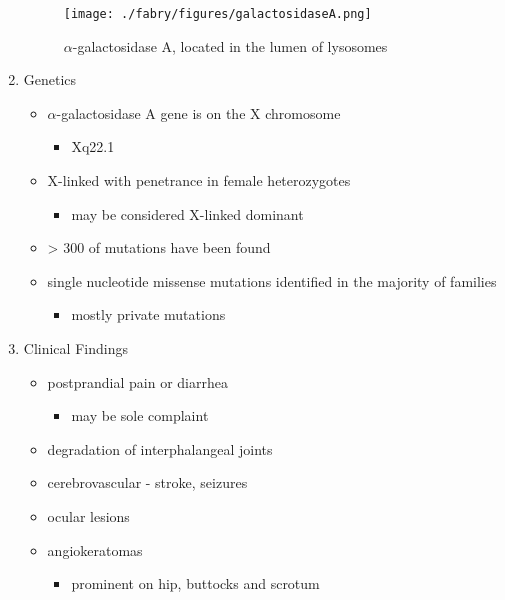 \documentclass{scrartcl}
\begin{document}
\begin{enumerate}
\begin{figure}[htbp]
\centering
\texttt{[image: ./fabry/figures/galactosidaseA.png]}
\caption[\(\alpha\)-galactosidase A]{\label{fig:org50e79ed}
\(\alpha\)-galactosidase A, located in the lumen of lysosomes}
\end{figure}

\item Genetics
\label{sec:org1d27f90}
\begin{itemize}
\item \(\alpha\)-galactosidase A gene is on the X chromosome
\begin{itemize}
\item Xq22.1
\end{itemize}
\item X-linked with penetrance in female heterozygotes
\begin{itemize}
\item may be considered X-linked dominant
\end{itemize}
\item \textgreater{} 300 of mutations have been found
\item single nucleotide missense mutations identified in the majority of families
\begin{itemize}
\item mostly private mutations
\end{itemize}
\end{itemize}

\item Clinical Findings
\label{sec:org705bda3}

\begin{itemize}
\item postprandial pain or diarrhea
\begin{itemize}
\item may be sole complaint
\end{itemize}
\item degradation of interphalangeal joints
\item cerebrovascular - stroke, seizures
\item ocular lesions
\item angiokeratomas
\begin{itemize}
\item prominent on hip, buttocks and scrotum
\end{itemize}
\end{itemize}


\end{enumerate}
\end{document}
